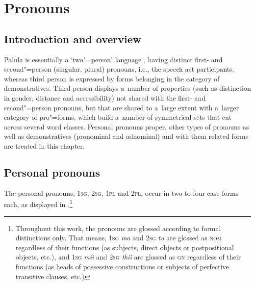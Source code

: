 \chapter{Pronouns}
\label{chap:5}

\section{Introduction and overview}
\label{sec:5-1}


Palula is essentially a `two"=person' language \citep[4--15]{bhat2004}, having distinct first- and second"=person (singular, plural) pronouns, i.e., the speech act participants, whereas third person is expressed by forms belonging in the category of demonstratives. Third person displays a~number of properties (such as distinction in gender, distance and accessibility) not shared with the first- and second"=person pronouns, but that are shared to a~large extent with a~larger category of pro"=forms, which build a~number of symmetrical sets that cut across several word classes. Personal pronouns proper, other types of pronouns as well as demonstratives (pronominal and adnominal) and with them related forms are treated in this chapter.


\section{Personal pronouns}
\label{sec:5-2}

The personal pronouns, \textsc{1sg}, \textsc{2sg}, \textsc{1pl} and \textsc{2pl}, occur in two to four case forms each, as displayed in .\footnote{Throughout this work, the pronouns are glossed according to formal distinctions only. That means, \textsc{1sg} \textit{ma} and \textsc{2sg} \textit{tu} are glossed as \textsc{nom} regardless of their functions (as subjects, direct objects or postpositional objects, etc.), and \textsc{1sg} \textit{míi} and \textsc{2sg} \textit{thíi} are glossed as \textsc{gn} regardless of their functions (as heads of possessive constructions or subjects of perfective transitive clauses, etc.)} 


